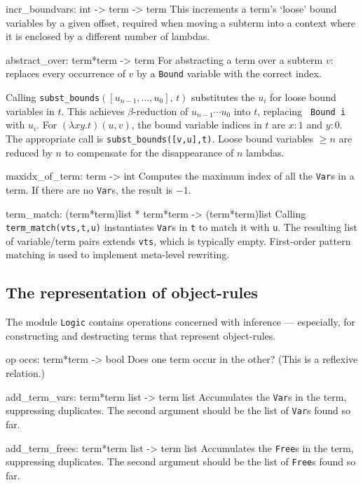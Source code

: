 \beginprog
incr_boundvars: int -> term -> term
\endprog
This increments a term's `loose' bound variables by a given offset,
required when moving a subterm into a context
where it is enclosed by a different number of lambdas.

\beginprog
abstract_over: term*term -> term
\endprog
For abstracting a term over a subterm \(v\):
replaces every occurrence of \(v\) by a {\tt Bound} variable
with the correct index.

Calling \verb|subst_bounds|$([u_{n-1},\ldots,u_0],\,t)$
substitutes the $u_i$ for loose bound variables in $t$.  This achieves
\(\beta\)-reduction of \(u_{n-1} \cdots u_0\) into $t$, replacing {\tt
Bound~i} with $u_i$.  For \((\lambda x y.t)(u,v)\), the bound variable
indices in $t$ are $x:1$ and $y:0$.  The appropriate call is
\verb|subst_bounds([v,u],t)|.  Loose bound variables $\geq n$ are reduced
by $n$ to compensate for the disappearance of $n$ lambdas.

\beginprog
maxidx_of_term: term -> int
\endprog
Computes the maximum index of all the {\tt Var}s in a term.
If there are no {\tt Var}s, the result is \(-1\).

\beginprog
term_match: (term*term)list * term*term -> (term*term)list
\endprog
Calling \verb|term_match(vts,t,u)| instantiates {\tt Var}s in {\tt t} to
match it with {\tt u}.  The resulting list of variable/term pairs extends
{\tt vts}, which is typically empty.  First-order pattern matching is used
to implement meta-level rewriting.


\subsection{The representation of object-rules}
The module {\tt Logic} contains operations concerned with inference ---
especially, for constructing and destructing terms that represent
object-rules.

\beginprog
op occs: term*term -> bool
\endprog
Does one term occur in the other?
(This is a reflexive relation.)

\beginprog
add_term_vars: term*term list -> term list
\endprog
Accumulates the {\tt Var}s in the term, suppressing duplicates.
The second argument should be the list of {\tt Var}s found so far.

\beginprog
add_term_frees: term*term list -> term list
\endprog
Accumulates the {\tt Free}s in the term, suppressing duplicates.
The second argument should be the list of {\tt Free}s found so far.

